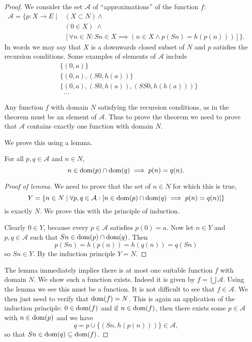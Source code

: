 \begin{proof}
We consider the set $\mathcal{A}$ of ``approximations'' of the function $f$:
\begin{align*}
\mathcal{A} = \{ p: X\to E \;|\; &(X\subset N)\land \\
&(0\in X)\;\land \\
&[\forall n\in N: Sn\in X \implies (n\in X \land p(Sn) = h(p(n)))] \}.
\end{align*}
In words we may say that $X$ is a downwards closed subset of $N$ and $p$ satisfies the recursion conditions. Some examples of elements of $\mathcal{A}$ include
\begin{align*}
&\{(0,a)\} \\
&\{(0,a), (S0, h(a))\} \\
&\{(0,a), (S0, h(a)), (SS0, h(h(a)))\} \\
&\;\;\ldots
\end{align*}

Any function $f$ with domain $N$ satisfying the recursion conditions, as in the theorem must be an element of $\mathcal{A}$. Thus to prove the theorem we need to prove that $\mathcal{A}$ contains exactly one function with domain $N$.

We prove this using a lemma.
\begin{lemma*}
For all $p,q\in \mathcal{A}$ and $n\in N$,
\[ n\in \operatorname{dom}(p)\cap\operatorname{dom}(q) \implies p(n) = q(n). \]
\end{lemma*}
\begin{proof}[Proof of lemma] \renewcommand{\qedsymbol}{$\dashv$ (Lemma)}
We need to prove that the set of $n\in N$ for which this is true,
\[ Y = \{n\in N \;|\; \forall p,q\in\mathcal{A}:\left[ n\in \operatorname{dom}(p)\cap\operatorname{dom}(q) \implies p(n) = q(n) \right] \} \]
is exactly $N$. We prove this with the principle of induction.

Clearly $0\in Y$, because every $p\in\mathcal{A}$ satisfies $p(0) = a$. Now let $n\in Y$ and $p,q\in\mathcal{A}$ such that $Sn\in \operatorname{dom}(p)\cap\operatorname{dom}(q)$. Then
\[ p(Sn) = h(p(n)) = h(q(n)) = q(Sn) \]
so $Sn\in Y$. By the induction principle $Y = N$.
\end{proof}
The lemma immediately implies there is at most one suitable function $f$ with domain $N$. We show such a function exists. Indeed it is given by $f = \bigcup \mathcal{A}$. Using the lemma we see this must be a function. It is not difficult to see that $f\in \mathcal{A}$. We then just need to verify that $\operatorname{dom}(f) = N$. This is again an application of the induction principle: $0\in \operatorname{dom}(f)$ and if $n\in \operatorname{dom}(f)$, then there exists some $p\in\mathcal{A}$ with $n\in\operatorname{dom}(p)$ and we have
\[ q = p\cup \{(Sn, h(p(n)))\}\in \mathcal{A}, \]
so that $Sn\in\operatorname{dom}(q)\subseteq \operatorname{dom}(f)$.
\end{proof}
